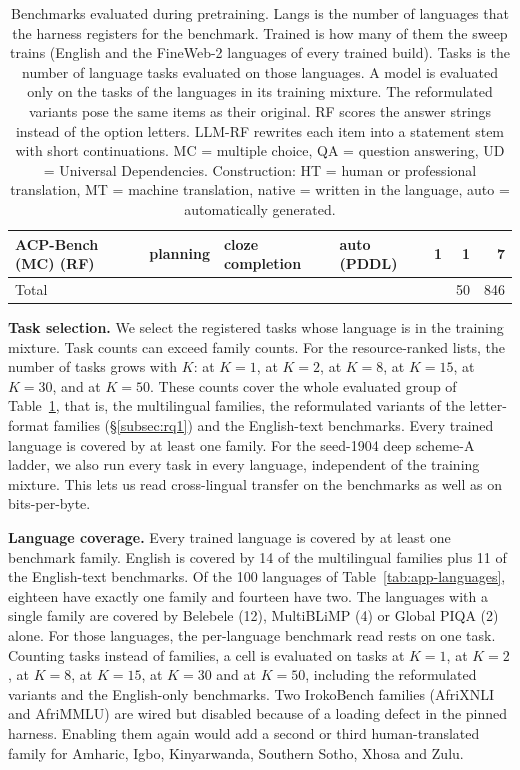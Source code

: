 \begin{table}[t]
{\begin{tabular}{llllrrr}
ACP-Bench (MC) (RF) & planning & cloze completion & auto (PDDL) & 1 & 1 & 7 \\
\midrule
Total & & & & & 50 & 846 \\
\bottomrule
\end{tabular}
}
\caption{Benchmarks evaluated during pretraining. Langs is the number of languages that the harness registers for the benchmark. Trained is how many of them the sweep trains (English and the FineWeb-2 languages of every trained build). Tasks is the number of language tasks evaluated on those languages. A model is evaluated only on the tasks of the languages in its training mixture. The reformulated variants pose the same items as their original. RF scores the answer strings instead of the option letters. LLM-RF rewrites each item into a statement stem with short continuations. MC = multiple choice, QA = question answering, UD = Universal Dependencies. Construction: HT = human or professional translation, MT = machine translation, native = written in the language, auto = automatically generated.}
\label{tab:benchmark-families}
\end{table}

\textbf{Task selection.} We select the registered tasks whose language is in the training mixture. Task counts can exceed family counts. For the resource-ranked lists, the number of tasks grows with $K$: \ntasksKone at $K=1$, \ntasksKtwo at $K=2$, \ntasksKeight at $K=8$, \ntasksKfifteen at $K=15$, \ntasksKthirty at $K=30$, and \ntasksKfifty at $K=50$. These counts cover the whole evaluated group of Table~\ref{tab:benchmark-families}, that is, the multilingual families, the reformulated variants of the letter-format families (\S\ref{subsec:rq1}) and the English-text benchmarks. Every trained language is covered by at least one family. For the seed-1904 deep scheme-A ladder, we also run every task in every language, independent of the training mixture. This lets us read cross-lingual transfer on the benchmarks as well as on bits-per-byte. 

\textbf{Language coverage.} Every trained language is covered by at least one benchmark family. English is covered by 14 of the multilingual families plus 11 of the English-text benchmarks. Of the 100 languages of Table~\ref{tab:app-languages}, eighteen have exactly one family and fourteen have two. The languages with a single family are covered by Belebele (12), MultiBLiMP (4) or Global PIQA (2) alone. For those languages, the per-language benchmark read rests on one task. Counting tasks instead of families, a cell is evaluated on \ntasksKone tasks at $K=1$, \ntasksKtwo at $K=2$, \ntasksKeight at $K=8$, \ntasksKfifteen at $K=15$, \ntasksKthirty at $K=30$ and \ntasksKfifty at $K=50$, including the reformulated variants and the English-only benchmarks. Two IrokoBench families (AfriXNLI and AfriMMLU) are wired but disabled because of a loading defect in the pinned harness. Enabling them again would add a second or third human-translated family for Amharic, Igbo, Kinyarwanda, Southern Sotho, Xhosa and Zulu.


